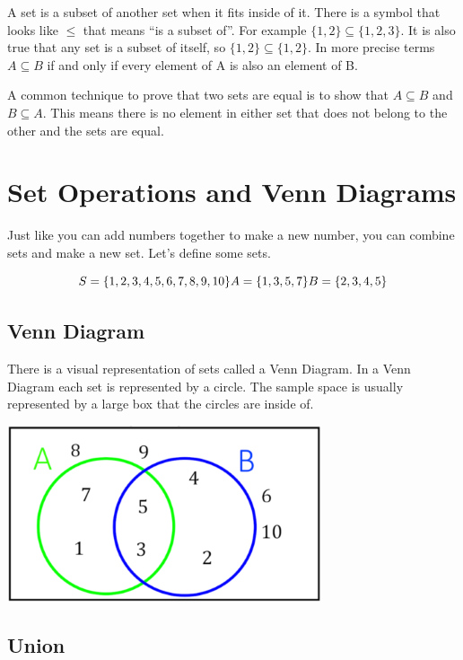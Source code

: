 \documentclass[
]{book}
\theoremstyle{definition}
\theoremstyle{definition}
\theoremstyle{definition}
\theoremstyle{remark}
\begin{document}
A set is a subset of another set when it fits inside of it. There is a symbol that looks like \(\leq\) that means ``is a subset of''. For example \(\{1,2\} \subseteq \{1,2,3\}\). It is also true that any set is a subset of itself, so \(\{1,2\} \subseteq \{1,2\}\). In more precise terms \(A \subseteq B\) if and only if every element of A is also an element of B.

A common technique to prove that two sets are equal is to show that \(A \subseteq B\) and \(B \subseteq A\). This means there is no element in either set that does not belong to the other and the sets are equal.

\hypertarget{set-operations-and-venn-diagrams}{%
\section{Set Operations and Venn Diagrams}\label{set-operations-and-venn-diagrams}}

Just like you can add numbers together to make a new number, you can combine sets and make a new set. Let's define some sets.

\[S = \{1,2,3,4,5,6,7,8,9,10\} \\
 A = \{1,3,5,7\} \\
 B = \{2,3,4,5\}\]

\hypertarget{venn-diagram}{%
\subsection{Venn Diagram}\label{venn-diagram}}

There is a visual representation of sets called a Venn Diagram. In a Venn Diagram each set is represented by a circle. The sample space is usually represented by a large box that the circles are inside of.

\includegraphics{Pictures/01-Sets/Venn.PNG}

\hypertarget{union}{%
\subsection{Union}\label{union}}
\end{document}
